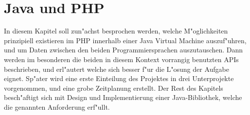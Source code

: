 \chapter{Java und PHP}
\label{sec:chap1}

In diesem Kapitel soll zun"achst besprochen werden, welche M"oglichkeiten prinzipiell existieren
im PHP innerhalb einer Java Virtual Machine auszuf"uhren, und um Daten zwischen den beiden
Programmiersprachen auszutauschen. Dann werden im besonderen die beiden in diesem Kontext
vorrangig benutzten APIs beschrieben, und erl"autert welche sich besser f"ur die L"osung der
Aufgabe eignet. Sp"ater wird eine erste Einteilung des Projektes in drei Unterprojekte vorgenommen,
und eine grobe Zeitplanung erstellt. Der Rest des Kapitels besch"aftigt sich mit Design und 
Implementierung einer Java-Bibliothek, welche die genannten Anforderung erf"ullt.







